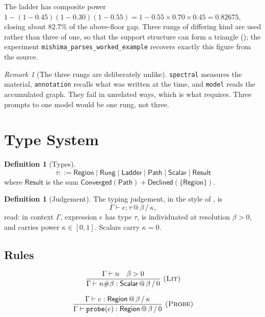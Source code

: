 \documentclass[11pt,twocolumn,a4paper]{article}
\theoremstyle{definition}
\newtheorem{definition}[theorem]{Definition}
\theoremstyle{remark}
\newtheorem{remark}[theorem]{Remark}
\newcommand{\flo}{\beta}
\newcommand{\pot}{\kappa}
\begin{document}
The ladder has composite power
$1-(1-0.45)(1-0.30)(1-0.55)=1-0.55\times0.70\times0.45=0.82675$, closing about
$82.7\%$ of the above-floor gap. Three rungs of differing kind are used rather
than three of one, so that the support structure can form a triangle
(); the experiment
\texttt{mishima\_parses\_worked\_example} recovers exactly this figure from the
source.

\begin{remark}[The three rungs are deliberately unlike]
\label{rem:three-unlike}
\texttt{spectral} measures the material, \texttt{annotation} recalls what was
written at the time, and \texttt{model} reads the accumulated graph. They fail in
unrelated ways, which is what  requires. Three prompts to one
model would be one rung, not three.
\end{remark}

\section{Type System}
\label{sec:types}

\begin{definition}[Types]
\label{def:types}
\[
  \tau ::= \textsf{Region} \mid \textsf{Rung} \mid \textsf{Ladder}
        \mid \textsf{Path} \mid \textsf{Scalar} \mid \textsf{Result}
\]
where $\textsf{Result}$ is the sum
$\textsf{Converged}(\textsf{Path})+\textsf{Declined}(\{\textsf{Region}\})$.
\end{definition}

\begin{definition}[Judgement]
\label{def:judgement}
The typing judgement, in the style of \citet{pierce2002types}, is
\[
  \Gamma \vdash e : \tau \,@\, \flo \,/\, \pot,
\]
read: in context $\Gamma$, expression $e$ has type $\tau$, is individuated at
resolution $\flo>0$, and carries power $\pot\in[0,1]$. Scalars carry $\pot=0$.
\end{definition}

\subsection{Rules}

\[
\frac{\Gamma \vdash n \quad \flo > 0}
     {\Gamma \vdash n\#\flo : \textsf{Scalar} \,@\, \flo \,/\, 0}
\ \textsc{(Lit)}
\]

\[
\frac{\Gamma \vdash e : \textsf{Region} \,@\, \flo \,/\, \pot}
     {\Gamma \vdash \texttt{probe}(e) : \textsf{Region} \,@\, \flo \,/\, 0}
\ \textsc{(Probe)}
\]
\end{document}
